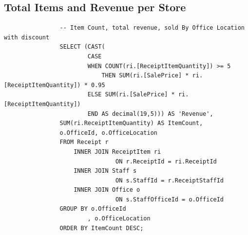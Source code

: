 \documentclass{article}
\begin{document}
             
            
\newpage

            \subsection{Total Items and Revenue per Store}
               
                \begin{lstlisting}
                -- Item Count, total revenue, sold By Office Location with discount
                SELECT (CAST(
                        CASE
                        WHEN COUNT(ri.[ReceiptItemQuantity]) >= 5
                            THEN SUM(ri.[SalePrice] * ri.[ReceiptItemQuantity]) * 0.95
                        ELSE SUM(ri.[SalePrice] * ri.[ReceiptItemQuantity])
                        END AS decimal(19,5))) AS 'Revenue',
                SUM(ri.ReceiptItemQuantity) AS ItemCount,
                o.OfficeId, o.OfficeLocation
                FROM Receipt r
                    INNER JOIN ReceiptItem ri
                                ON r.ReceiptId = ri.ReceiptId
                    INNER JOIN Staff s
                                ON s.StaffId = r.ReceiptStaffId
                    INNER JOIN Office o
                                ON s.StaffOfficeId = o.OfficeId
                GROUP BY o.OfficeId
                        , o.OfficeLocation
                ORDER BY ItemCount DESC;
                \end{lstlisting}
\end{document}

